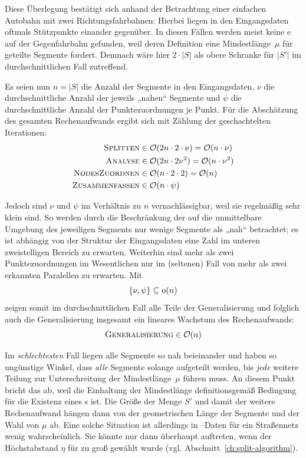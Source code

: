 \documentclass[../main/thesis.tex]{subfiles}
\begin{document}
Diese Überlegung bestätigt sich anhand der Betrachtung einer einfachen Autobahn mit zwei Richtungsfahrbahnen:
Hierbei liegen in den Eingangsdaten oftmals Stützpunkte einander gegenüber.
In diesen Fällen werden meist keine e auf der Gegenfahrbahn gefunden, weil deren Definition eine Mindestlänge~$\mu$ für geteilte Segmente fordert.
Demnach wäre hier $2 \cdot |S|$ als obere Schranke für $|S'|$ im durchschnittlichen Fall zutreffend.

Es seien nun $n = |S|$ die Anzahl der Segmente in den Eingangsdaten, $\nu$ die durchschnittliche Anzahl der jeweils „nahen“ Segmente und $\psi$ die durchschnittliche Anzahl der Punktezuordnungen je Punkt.
Für die Abschätzung des gesamten Rechenaufwands ergibt sich mit Zählung der geschachtelten Iterationen: 
\begin{align*}
\textproc{Splitten} &\in \mathcal{O}(2 n \cdot 2 \cdot \nu) = \mathcal{O}(n \cdot \nu)
\\
\textproc{Analyse} &\in \mathcal{O}(2 n \cdot 2 \nu^2) = \mathcal{O}(n \cdot \nu^2)
\\
\textproc{NodesZuordnen} &\in \mathcal{O}(n \cdot 2 \cdot 2) = \mathcal{O}(n)
\\
\textproc{Zusammenfassen} &\in \mathcal{O}(n \cdot \psi)
\end{align*}

Jedoch sind $\nu$ und $\psi$ im Verhältnis zu $n$ vernachlässigbar, weil sie regelmäßig sehr klein sind.
So werden durch die Beschränkung der  auf die unmittelbare Umgebung des jeweiligen Segments nur wenige Segmente als „nah“ betrachtet;
es ist abhängig von der Struktur der Eingangsdaten eine Zahl im unteren zweistelligen Bereich zu erwarten.
Weiterhin sind mehr als zwei Punktezuordnungen im Wesentlichen nur im (seltenen) Fall von mehr als zwei erkannten Paralellen zu erwarten.
Mit
\[
\{\nu, \psi\} \subseteq \hbox{o}(n)
\]
zeigen somit im durchschnittlichen Fall alle Teile der Generalisierung und folglich auch die Generalisierung insgesamt ein lineares Wachstum des Rechenaufwands:
\[
\textproc{Generalisierung} \in \mathcal{O}(n)
\]


Im \emph{schlechtesten} Fall liegen alle Segmente so nah beieinander und haben so ungünstige Winkel, dass \emph{alle} Segmente solange aufgeteilt werden, bis \emph{jede} weitere Teilung zur Unterschreitung der Mindestlänge~$\mu$ führen muss.
An diesem Punkt bricht das  ab, weil die Einhaltung der Mindestlänge definitionsgemäß Bedingung für die Existenz eines s ist.
Die Größe der Menge $S'$ und damit der weitere Rechenaufwand hängen dann von der geometrischen Länge der Segmente und der Wahl von $\mu$ ab.
Eine solche Situation ist allerdings in --Daten für ein Straßennetz wenig wahrscheinlich.
Sie könnte nur dann überhaupt auftreten, wenn der Höchstabstand $\eta$ für  zu groß gewählt wurde (vgl. Abschnitt~\ref{ch:split-algorithm}).
\end{document}
